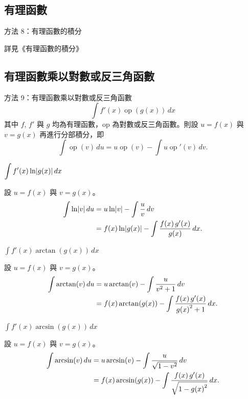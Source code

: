 \documentclass{beamer}
\newcommand{\Left} {\mathopen{}\mathclose\bgroup\left}
\newcommand{\Right}{\aftergroup\egroup\right}
\newcommand{\op}  {\operatorname{op}}
\theoremstyle{remark}
\begin{document}
\begin{CJK}{UTF8}{bsmi}
\subsection{有理函數}
\begin{frame}{方法 8：有理函數的積分}
  \centerline{詳見《有理函數的積分》}
\end{frame}

\subsection[有理函數乘以反函數]{有理函數乘以對數或反三角函數}
\begin{frame}{方法 9：有理函數乘以對數或反三角函數}
  \[\int f'(x) \op(g(x))\,dx\]
  其中 $f$, $f'$ 與 $g$ 均為有理函數，op 為對數或反三角函數。則設 $u = f(x)$ 與 $v = g(x)$ 再進行分部積分，即
  \[\int \op(v)\,du = u \op(v) - \int u \op'(v)\,dv.\]
\end{frame}

\begin{frame}{$\displaystyle \int f'(x) \ln \Left| g(x) \Right|\,dx$}
  \begin{solution}
    設 $u = f(x)$ 與 $v = g(x)$。
    \begin{align*}
      \int \ln \Left| v \Right|\,du &= u \ln \Left| v \Right| - \int \frac u v \,dv\\
	&= f(x) \ln \Left| g(x) \Right| - \int \frac{f(x)\,g'(x)}{g(x)}\,dx.
    \end{align*}
  \end{solution}
\end{frame}

\begin{frame}{$\displaystyle \int f'(x) \arctan(g(x))\,dx$}
  \begin{solution}
    設 $u = f(x)$ 與 $v = g(x)$。
    \begin{align*}
      \int \arctan(v)\,du &= u \arctan(v) - \int \frac{u}{v^2 + 1}\,dv\\
	&= f(x) \arctan(g(x)) - \int \frac{f(x)\,g'(x)}{g \Left( x \Right)^2 + 1}\,dx.
    \end{align*}
  \end{solution}
\end{frame}

\begin{frame}{$\displaystyle \int f'(x) \arcsin(g(x))\,dx$}
  \begin{solution}
    設 $u = f(x)$ 與 $v = g(x)$。
    \begin{align*}
      \int \arcsin(v)\,du &= u \arcsin(v) - \int \frac{u}{\sqrt{1 - v^2}}\,dv\\
	&= f(x) \arcsin(g(x)) - \int \frac{f(x)\,g'(x)}{\sqrt{1 - g \Left( x \Right)^2}}\,dx.
    \end{align*}
  \end{solution}
\end{frame}


\end{CJK}
\end{document}

